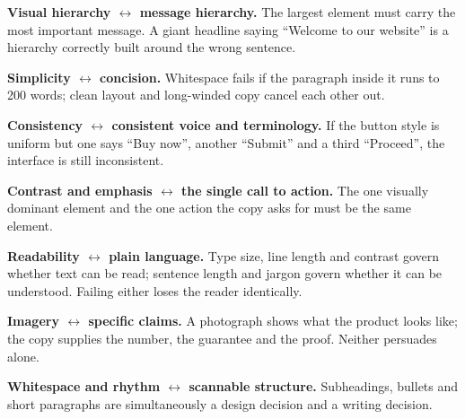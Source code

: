 \begin{qlist}
\begin{apts}
\item \textbf{Visual hierarchy $\leftrightarrow$ message hierarchy.} The largest
      element must carry the most important message. A giant headline saying
      ``Welcome to our website'' is a hierarchy correctly built around the wrong
      sentence.
\item \textbf{Simplicity $\leftrightarrow$ concision.} Whitespace fails if the
      paragraph inside it runs to 200 words; clean layout and long-winded copy
      cancel each other out.
\item \textbf{Consistency $\leftrightarrow$ consistent voice and terminology.}
      If the button style is uniform but one says ``Buy now'', another ``Submit''
      and a third ``Proceed'', the interface is still inconsistent.
\item \textbf{Contrast and emphasis $\leftrightarrow$ the single call to
      action.} The one visually dominant element and the one action the copy
      asks for must be the same element.
\item \textbf{Readability $\leftrightarrow$ plain language.} Type size, line
      length and contrast govern whether text can be read; sentence length and
      jargon govern whether it can be understood. Failing either loses the
      reader identically.
\item \textbf{Imagery $\leftrightarrow$ specific claims.} A photograph shows
      what the product looks like; the copy supplies the number, the guarantee
      and the proof. Neither persuades alone.
\item \textbf{Whitespace and rhythm $\leftrightarrow$ scannable structure.}
      Subheadings, bullets and short paragraphs are simultaneously a design
      decision and a writing decision.
\end{apts}


\end{qlist}
